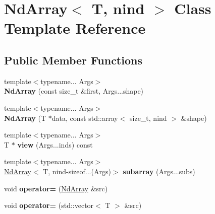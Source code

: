 \hypertarget{classNdArray}{}\section{Nd\+Array$<$ T, nind $>$ Class Template Reference}
\label{classNdArray}
\subsection*{Public Member Functions}
\begin{DoxyCompactItemize}
\item 
{\footnotesize template$<$typename... Args$>$ }\\{\bfseries Nd\+Array} (const size\+\_\+t \&first, Args...\+shape)\hypertarget{classNdArray_a9e042cc4285e41ed3a9bdfcf074555fa}{}\label{classNdArray_a9e042cc4285e41ed3a9bdfcf074555fa}

\item 
{\footnotesize template$<$typename... Args$>$ }\\{\bfseries Nd\+Array} (T $\ast$data, const std\+::array$<$ size\+\_\+t, nind $>$ \&shape)\hypertarget{classNdArray_a0b0e4a91bc169ea766ee4e9c828af37f}{}\label{classNdArray_a0b0e4a91bc169ea766ee4e9c828af37f}

\item 
{\footnotesize template$<$typename... Args$>$ }\\T $\ast$ {\bfseries view} (Args...\+inds) const \hypertarget{classNdArray_a1fd4c7ca9ffbab0ee557fd706156eeac}{}\label{classNdArray_a1fd4c7ca9ffbab0ee557fd706156eeac}

\item 
{\footnotesize template$<$typename... Args$>$ }\\\hyperlink{classNdArray}{Nd\+Array}$<$ T, nind-\/sizeof...(Args)$>$ {\bfseries subarray} (Args...\+subs)\hypertarget{classNdArray_a6835f0d3ef202f8a0b3f0119aa11fef1}{}\label{classNdArray_a6835f0d3ef202f8a0b3f0119aa11fef1}

\item 
void {\bfseries operator=} (\hyperlink{classNdArray}{Nd\+Array} \&src)\hypertarget{classNdArray_a91942f32157c1c27a9ae8aad24128bd6}{}\label{classNdArray_a91942f32157c1c27a9ae8aad24128bd6}

\item 
void {\bfseries operator=} (std\+::vector$<$ T $>$ \&src)\hypertarget{classNdArray_a58b8dc6c7a1af018e5db340c487be710}{}\label{classNdArray_a58b8dc6c7a1af018e5db340c487be710}


\end{DoxyCompactItemize}
